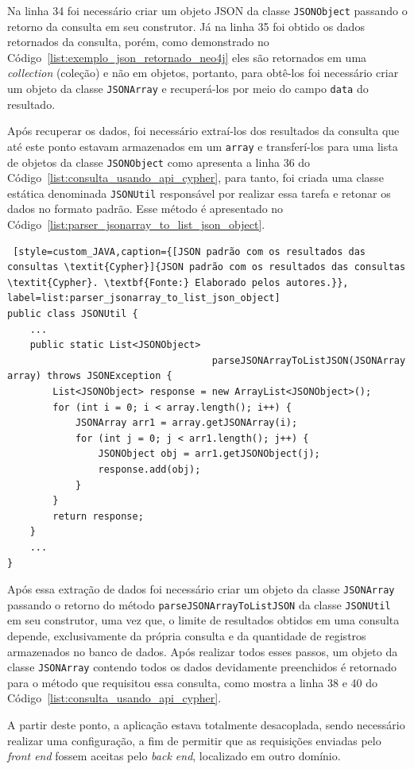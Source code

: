 Na linha 34 foi necessário criar um objeto JSON da classe \texttt{JSONObject} passando o retorno da consulta em seu construtor. Já na linha 35 foi obtido os dados retornados da consulta, porém, como demonstrado no Código~\ref{list:exemplo_json_retornado_neo4j} eles são retornados em uma \textit{collection} (coleção) e não em objetos, portanto, para obtê-los foi necessário criar um objeto da classe \texttt{JSONArray} e recuperá-los por meio do campo \texttt{data} do resultado.

Após recuperar os dados, foi necessário extraí-los dos resultados da consulta que até este ponto estavam armazenados em um \texttt{array} e transferí-los para uma lista de objetos da classe \texttt{JSONObject} como apresenta a linha 36 do Código~\ref{list:consulta_usando_api_cypher}, para tanto, foi criada uma classe estática denominada \texttt{JSONUtil} responsável por realizar essa tarefa e retonar os dados no formato padrão. Esse método é apresentado no Código~\ref{list:parser_jsonarray_to_list_json_object}.

\begin{lstlisting} [style=custom_JAVA,caption={[JSON padrão com os resultados das consultas \textit{Cypher}]{JSON padrão com os resultados das consultas \textit{Cypher}. \textbf{Fonte:} Elaborado pelos autores.}}, label=list:parser_jsonarray_to_list_json_object] 	
public class JSONUtil {
	...
	public static List<JSONObject>
									parseJSONArrayToListJSON(JSONArray array) throws JSONException {
		List<JSONObject> response = new ArrayList<JSONObject>();
		for (int i = 0; i < array.length(); i++) {
			JSONArray arr1 = array.getJSONArray(i);
			for (int j = 0; j < arr1.length(); j++) {
				JSONObject obj = arr1.getJSONObject(j);
				response.add(obj);
			}
		}
		return response;
	}
	...
}
\end{lstlisting}

Após essa extração de dados foi necessário criar um objeto da classe \texttt{JSONArray} passando o retorno do método \texttt{parseJSONArrayToListJSON} da classe \texttt{JSONUtil} em seu construtor, uma vez que, o limite de resultados obtidos em uma consulta depende, exclusivamente da própria consulta e da quantidade de registros armazenados no banco de dados. Após realizar todos esses passos, um objeto da classe \texttt{JSONArray} contendo todos os dados devidamente preenchidos é retornado para o método que requisitou essa consulta, como mostra a linha 38 e 40 do Código~\ref{list:consulta_usando_api_cypher}.
 
\par A partir deste ponto, a aplicação estava totalmente desacoplada, sendo necessário realizar uma configuração, a fim de permitir que as requisições enviadas pelo \textit{front end} fossem aceitas pelo \textit{back end}, localizado em outro domínio.

